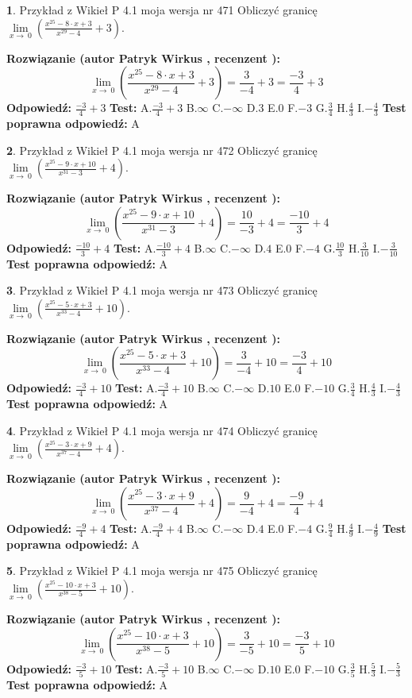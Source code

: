 \documentclass[12pt, a4paper]{article}
\theoremstyle{definition} %
\newtheorem{zad}{}
\newcommand{\zadStart}[1]{\begin{zad}#1\newline}
\newcommand{\zadStop}{\end{zad}}
\newcommand{\rozwStart}[2]{\noindent \textbf{Rozwiązanie (autor #1 , recenzent #2): }\newline}
\newcommand{\rozwStop}{\newline}
\newcommand{\odpStart}{\noindent \textbf{Odpowiedź:}\newline}
\newcommand{\odpStop}{\newline}
\newcommand{\testStart}{\noindent \textbf{Test:}\newline}
\newcommand{\testStop}{\newline}
\newcommand{\kluczStart}{\noindent \textbf{Test poprawna odpowiedź:}\newline}
\newcommand{\kluczStop}{\newline}
\begin{document}
\zadStart{Przykład z Wikieł P 4.1 moja wersja nr 471}
Obliczyć granicę $\lim\limits_{x\to\ 0}(\frac{x^{25}-8 \cdot x +3}{x^{29}-4}+3)$.
\zadStop
\rozwStart{Patryk Wirkus}{}
$$\lim\limits_{x\to\ 0}(\frac{x^{25}-8 \cdot x +3}{x^{29}-4}+3)=\frac{3}{-4}+3=\frac{-3}{4}+3$$
\rozwStop
\odpStart
$\frac{-3}{4}+3$
\odpStop
\testStart
A.$\frac{-3}{4}+3$
B.$\infty$
C.$-\infty$
D.$3$
E.$0$
F.$-3$
G.$\frac{3}{4}$
H.$\frac{4}{3}$
I.$-\frac{4}{3}$
\testStop
\kluczStart
A
\kluczStop



\zadStart{Przykład z Wikieł P 4.1 moja wersja nr 472}
Obliczyć granicę $\lim\limits_{x\to\ 0}(\frac{x^{25}-9 \cdot x +10}{x^{31}-3}+4)$.
\zadStop
\rozwStart{Patryk Wirkus}{}
$$\lim\limits_{x\to\ 0}(\frac{x^{25}-9 \cdot x +10}{x^{31}-3}+4)=\frac{10}{-3}+4=\frac{-10}{3}+4$$
\rozwStop
\odpStart
$\frac{-10}{3}+4$
\odpStop
\testStart
A.$\frac{-10}{3}+4$
B.$\infty$
C.$-\infty$
D.$4$
E.$0$
F.$-4$
G.$\frac{10}{3}$
H.$\frac{3}{10}$
I.$-\frac{3}{10}$
\testStop
\kluczStart
A
\kluczStop



\zadStart{Przykład z Wikieł P 4.1 moja wersja nr 473}
Obliczyć granicę $\lim\limits_{x\to\ 0}(\frac{x^{25}-5 \cdot x +3}{x^{33}-4}+10)$.
\zadStop
\rozwStart{Patryk Wirkus}{}
$$\lim\limits_{x\to\ 0}(\frac{x^{25}-5 \cdot x +3}{x^{33}-4}+10)=\frac{3}{-4}+10=\frac{-3}{4}+10$$
\rozwStop
\odpStart
$\frac{-3}{4}+10$
\odpStop
\testStart
A.$\frac{-3}{4}+10$
B.$\infty$
C.$-\infty$
D.$10$
E.$0$
F.$-10$
G.$\frac{3}{4}$
H.$\frac{4}{3}$
I.$-\frac{4}{3}$
\testStop
\kluczStart
A
\kluczStop



\zadStart{Przykład z Wikieł P 4.1 moja wersja nr 474}
Obliczyć granicę $\lim\limits_{x\to\ 0}(\frac{x^{25}-3 \cdot x +9}{x^{37}-4}+4)$.
\zadStop
\rozwStart{Patryk Wirkus}{}
$$\lim\limits_{x\to\ 0}(\frac{x^{25}-3 \cdot x +9}{x^{37}-4}+4)=\frac{9}{-4}+4=\frac{-9}{4}+4$$
\rozwStop
\odpStart
$\frac{-9}{4}+4$
\odpStop
\testStart
A.$\frac{-9}{4}+4$
B.$\infty$
C.$-\infty$
D.$4$
E.$0$
F.$-4$
G.$\frac{9}{4}$
H.$\frac{4}{9}$
I.$-\frac{4}{9}$
\testStop
\kluczStart
A
\kluczStop



\zadStart{Przykład z Wikieł P 4.1 moja wersja nr 475}
Obliczyć granicę $\lim\limits_{x\to\ 0}(\frac{x^{25}-10 \cdot x +3}{x^{38}-5}+10)$.
\zadStop
\rozwStart{Patryk Wirkus}{}
$$\lim\limits_{x\to\ 0}(\frac{x^{25}-10 \cdot x +3}{x^{38}-5}+10)=\frac{3}{-5}+10=\frac{-3}{5}+10$$
\rozwStop
\odpStart
$\frac{-3}{5}+10$
\odpStop
\testStart
A.$\frac{-3}{5}+10$
B.$\infty$
C.$-\infty$
D.$10$
E.$0$
F.$-10$
G.$\frac{3}{5}$
H.$\frac{5}{3}$
I.$-\frac{5}{3}$
\testStop
\kluczStart
A
\kluczStop
\end{document}
